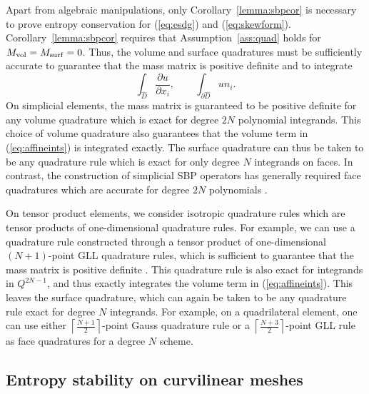 \documentclass[review]{siamart0216}
\theoremstyle{assumption}
\renewcommand{\hat}[1]{\hat{#1}}
\newcommand{\pd}[2]{\frac{\partial#1}{\partial#2}}
\renewcommand{\hat}{\widehat}
\begin{document}
Apart from algebraic manipulations, only Corollary~\ref{lemma:sbpcor} is necessary to prove entropy conservation for (\ref{eq:esdg})  and (\ref{eq:skewform}).  Corollary~\ref{lemma:sbpcor} requires that Assumption~\ref{ass:quad} holds for $M_{\rm vol}=M_{\rm surf}=0$.  Thus, the volume and surface quadratures must be sufficiently accurate to guarantee that the mass matrix is positive definite and to integrate 
\begin{equation}
\int_{\hat{D}} \pd{u}{x_i}, \qquad \int_{\partial \hat{D}} u n_i. \label{eq:affineints}
\end{equation}
On simplicial elements, the mass matrix is guaranteed to be positive definite for any volume quadrature which is exact for degree $2N$ polynomial integrands.  This choice of volume quadrature also guarantees that the volume term in (\ref{eq:affineints}) is integrated exactly.  The surface quadrature can thus be taken to be any quadrature rule which is exact for only degree $N$ integrands on faces.  In contrast, the construction of simplicial SBP operators has generally required face quadratures which are accurate for degree $2N$ polynomials \cite{hicken2016multidimensional, crean2018entropy, chan2018discretely}.  

On tensor product elements, we consider isotropic quadrature rules which are tensor products of one-dimensional quadrature rules.  For example, we can use a quadrature rule constructed through a tensor product of one-dimensional $(N+1)$-point GLL quadrature rules, which is sufficient to guarantee that the mass matrix is positive definite \cite{canuto2007spectral}.  This quadrature rule is also exact for integrands in $Q^{2N-1}$, and thus exactly integrates the volume term in (\ref{eq:affineints}).  This leaves the surface quadrature, which can again be taken to be any quadrature rule exact for degree $N$ integrands.  For example, on a quadrilateral element, one can use either $\left\lceil\frac{N+1}{2}\right\rceil$-point Gauss quadrature rule or a $\left\lceil\frac{N+3}{2}\right\rceil$-point GLL rule as face quadratures for a degree $N$ scheme.


\subsection{Entropy stability on curvilinear meshes}
\label{sec:curved}
\end{document}
